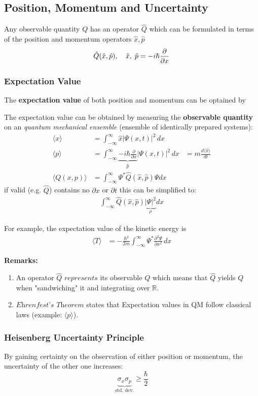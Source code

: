 \subsection{Position, Momentum and Uncertainty}
Any observable quantity $Q$ has an operator $\hat{Q}$ which can be formulated in terms of the position and momentum operators $\hat{x}, \hat{p}$
\begin{equation*}
    \hat{Q}(\hat{x},\hat{p}), \hspace*{10pt} \hat{x},\; \hat{p}=-i\hbar \frac{\partial}{\partial x}
\end{equation*}


\subsubsection{Expectation Value}
The \textbf{expectation value} of both position and momentum can be optained by

The expectation value can be obtained by measuring the \textbf{observable quantity} on an \textit{quantum mechanical ensemble} (ensemble of identically prepared systems):
\begin{align*}
    \langle x \rangle     & = \int_{-\infty}^{\infty} \hat{x} |\Psi(x,t)|^2 \, dx                                                                                              \\
    \langle p \rangle     & = \int_{-\infty}^{\infty} \underbrace{-i\hbar \frac{\partial}{\partial x}}_{\hat{p}} |\Psi(x,t)|^2 \, dx & = m \frac{d\langle \hat{x} \rangle}{dt} \\
    \langle Q(x,p)\rangle & = \int_{-\infty}^{\infty}\Psi^*\hat{Q}(\hat{x},\hat{p})\Psi dx
\end{align*}
if valid (e.g. $\hat{Q}$) contains no $\partial{x}$ or $\partial{t}$ this can be simplified to:\\
\begin{align*}
    \int_{-\infty}^{\infty}\hat{Q}(\hat{x},\hat{p}) \underbrace{|\Psi|^2}_{\rho} dx
\end{align*}

For example, the expectation value of the kinetic energy is
\begin{align*}
    \langle T \rangle & = -\frac{\hbar^2}{2m}\int_{-\infty}^{\infty}\Psi^*\frac{\partial^2\Psi}{\partial x^2} \,dx
\end{align*}

\textbf{Remarks:}
\begin{enumerate}
    \item An operator $\hat{Q}$ $\textit{represents}$ its observable $Q$ which means that $\hat{Q}$ yields $Q$ when "sandwiching" it and integrating over $\mathbb{R}$.
    \item $\textit{Ehrenfest's Theorem}$ states that Expectation values in QM follow classical laws (example: $\langle p \rangle$).
\end{enumerate}

\subsubsection{Heisenberg Uncertainty Principle}
By gaining certainty on the observation of either position or momentum, the uncertainty of the other one increases:
\begin{equation*}
    \underbrace{\sigma_x\sigma_p}_{\text{std.\ dev.}} \geq \frac{\hbar}{2}
\end{equation*}


